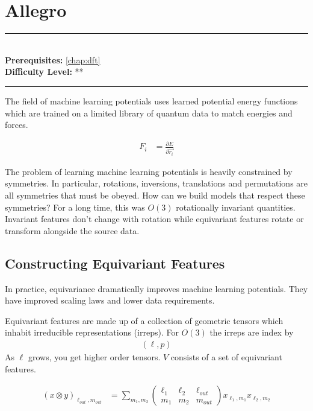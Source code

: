 \documentclass[book.tex]{subfiles}
\begin{document}
\chapter{Allegro}

\label{chap:allegro}
\noindent\rule{11cm}{0.4pt} \\
\textbf{Prerequisites:} \autoref{chap:dft} \\
\textbf{Difficulty Level:} ** \\
\noindent\rule{11cm}{0.4pt}
\vspace{5mm}

The field of machine learning potentials uses learned potential energy functions which are trained on a limited library of quantum data to match energies and forces.

\begin{align}
F_i &= \frac{\partial E}{\partial \vec{r_i}}
\end{align}

The problem of learning machine learning potentials is heavily constrained by symmetries. In particular, rotations, inversions, translations and permutations are all symmetries that must be obeyed. How can we build models that respect these symmetries? For a long time, this was $O(3)$ rotationally invariant quantities. Invariant features don't change with rotation while equivariant features rotate or transform alongside the source data.

\section{Constructing Equivariant Features}

In practice, equivariance dramatically improves machine learning potentials. They have improved scaling laws and lower data requirements.

Equivariant features are made up of a collection of geometric tensors which inhabit irreducible representations (irreps). For $O(3)$ the irreps are index by
\begin{align}
(\ell, p)
\end{align}
As $\ell$ grows, you get higher order tensors. $V$ consists of a set of equivariant features.

\begin{align}
(x \otimes y)_{\ell_{out}, m_{out}} &= \sum_{m_1, m_2} \begin{pmatrix}
\ell_1 & \ell_2 & \ell_{out} \\
m_1 & m_2 & m_{out}
\end{pmatrix} x_{\ell_1, m_1} x_{\ell_2, m_2}
\end{align}
\end{document}
